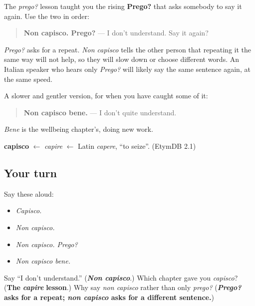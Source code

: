 The \emph{prego?} lesson taught you the rising \textbf{Prego?} that asks somebody to say it again. Use the two in order:

\begin{quote}
\textbf{Non capisco. Prego?} — I don't understand. Say it again?
\end{quote}

\emph{Prego?} asks for a repeat. \emph{Non capisco} tells the other person that repeating it the same way will not help, so they will slow down or choose different words. An Italian speaker who hears only \emph{Prego?} will likely say the same sentence again, at the same speed.

A slower and gentler version, for when you have caught some of it:

\begin{quote}
\textbf{Non capisco bene.} — I don't quite understand.
\end{quote}

\emph{Bene} is the wellbeing chapter's, doing new work.

\begin{cousinweb}
\textbf{capisco} $\leftarrow$ \emph{capire} $\leftarrow$ Latin \emph{capere}, \textquotedblleft{}to seize\textquotedblright{}. (EtymDB 2.1)
\end{cousinweb}

\subsection*{Your turn}
Say these aloud:

\begin{itemize}
\raggedright
  \item \emph{Capisco.}
  \item \emph{Non capisco.}
  \item \emph{Non capisco. Prego?}
  \item \emph{Non capisco bene.}
\end{itemize}

\begin{tcolorbox}[breakable,colback=teal!4,colframe=teal!35!black,title={Before you move on}]
Say \textquotedblleft{}I don't understand.\textquotedblright{} (\emph{\textbf{Non capisco}}.) Which chapter gave you \emph{capisco}? (\textbf{The} \emph{\textbf{capire}} \textbf{lesson}.) Why say \emph{non capisco} rather than only \emph{prego?} (\emph{\textbf{Prego?}} \textbf{asks for a repeat; \emph{non capisco} asks for a different sentence.})
\end{tcolorbox}
